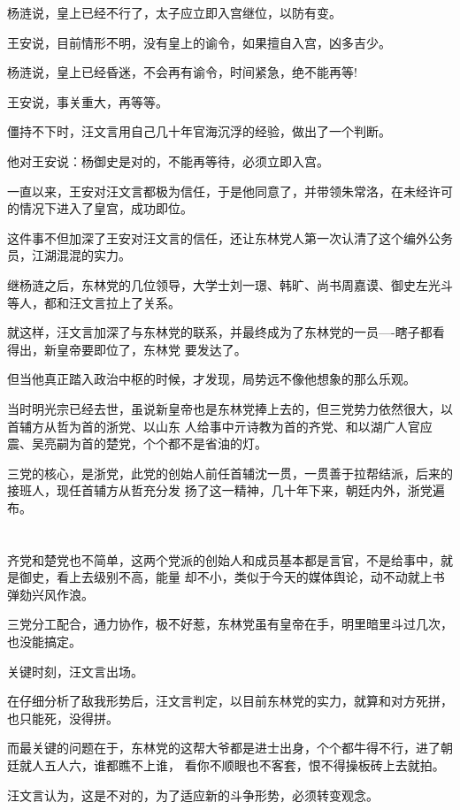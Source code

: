 \documentclass[11pt,a4paper,onecolumn]{article}
\begin{document}
杨涟说，皇上已经不行了，太子应立即入宫继位，以防有变。

王安说，目前情形不明，没有皇上的谕令，如果擅自入宫，凶多吉少。

杨涟说，皇上已经昏迷，不会再有谕令，时间紧急，绝不能再等!

王安说，事关重大，再等等。

僵持不下时，汪文言用自己几十年官海沉浮的经验，做出了一个判断。

他对王安说：杨御史是对的，不能再等待，必须立即入宫。

一直以来，王安对汪文言都极为信任，于是他同意了，并带领朱常洛，在未经许可的情况下进入了皇宫，成功即位。

这件事不但加深了王安对汪文言的信任，还让东林党人第一次认清了这个编外公务员，江湖混混的实力。

继杨涟之后，东林党的几位领导，大学士刘一璟、韩旷、尚书周嘉谟、御史左光斗等人，都和汪文言拉上了关系。

就这样，汪文言加深了与东林党的联系，并最终成为了东林党的一员----瞎子都看得出，新皇帝要即位了，东林党
要发达了。

但当他真正踏入政治中枢的时候，才发现，局势远不像他想象的那么乐观。

当时明光宗已经去世，虽说新皇帝也是东林党捧上去的，但三党势力依然很大，以首辅方从哲为首的浙党、以山东
人给事中亓诗教为首的齐党、和以湖广人官应震、吴亮嗣为首的楚党，个个都不是省油的灯。

三党的核心，是浙党，此党的创始人前任首辅沈一贯，一贯善于拉帮结派，后来的接班人，现任首辅方从哲充分发
扬了这一精神，几十年下来，朝廷内外，浙党遍布。

\section[\thesection]{}

齐党和楚党也不简单，这两个党派的创始人和成员基本都是言官，不是给事中，就是御史，看上去级别不高，能量
却不小，类似于今天的媒体舆论，动不动就上书弹劾兴风作浪。

三党分工配合，通力协作，极不好惹，东林党虽有皇帝在手，明里暗里斗过几次，也没能搞定。

关键时刻，汪文言出场。

在仔细分析了敌我形势后，汪文言判定，以目前东林党的实力，就算和对方死拼，也只能死，没得拼。

而最关键的问题在于，东林党的这帮大爷都是进士出身，个个都牛得不行，进了朝廷就人五人六，谁都瞧不上谁，
看你不顺眼也不客套，恨不得操板砖上去就拍。

汪文言认为，这是不对的，为了适应新的斗争形势，必须转变观念。
\end{document}
